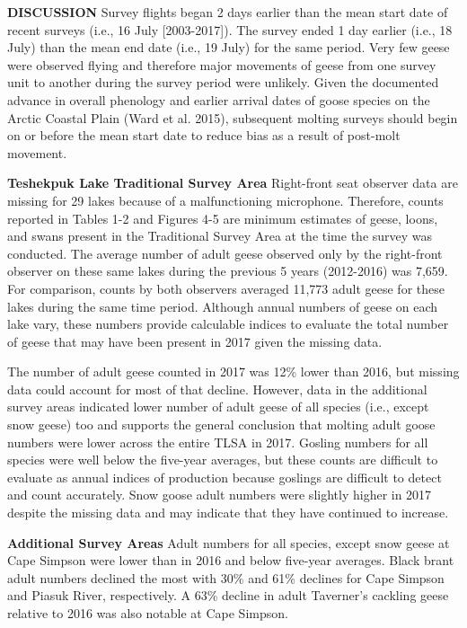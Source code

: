\documentclass[]{article}
\begin{document}
\textbf{DISCUSSION}\break
Survey flights began 2 days earlier than the mean start date of recent
surveys (i.e., 16 July {[}2003-2017{]}). The survey ended 1 day earlier
(i.e., 18 July) than the mean end date (i.e., 19 July) for the same
period. Very few geese were observed flying and therefore major
movements of geese from one survey unit to another during the survey
period were unlikely. Given the documented advance in overall phenology
and earlier arrival dates of goose species on the Arctic Coastal Plain
(Ward et al. 2015), subsequent molting surveys should begin on or before
the mean start date to reduce bias as a result of post-molt movement.

\textbf{Teshekpuk Lake Traditional Survey Area}\newline
Right-front seat observer data are missing for 29 lakes because of a
malfunctioning microphone. Therefore, counts reported in Tables 1-2 and
Figures 4-5 are minimum estimates of geese, loons, and swans present in
the Traditional Survey Area at the time the survey was conducted. The
average number of adult geese observed only by the right-front observer
on these same lakes during the previous 5 years (2012-2016) was 7,659.
For comparison, counts by both observers averaged 11,773 adult geese for
these lakes during the same time period. Although annual numbers of
geese on each lake vary, these numbers provide calculable indices to
evaluate the total number of geese that may have been present in 2017
given the missing data.

The number of adult geese counted in 2017 was 12\% lower than 2016, but
missing data could account for most of that decline. However, data in
the additional survey areas indicated lower number of adult geese of all
species (i.e., except snow geese) too and supports the general
conclusion that molting adult goose numbers were lower across the entire
TLSA in 2017. Gosling numbers for all species were well below the
five-year averages, but these counts are difficult to evaluate as annual
indices of production because goslings are difficult to detect and count
accurately. Snow goose adult numbers were slightly higher in 2017
despite the missing data and may indicate that they have continued to
increase.

\textbf{Additional Survey Areas}\newline
Adult numbers for all species, except snow geese at Cape Simpson were
lower than in 2016 and below five-year averages. Black brant adult
numbers declined the most with 30\% and 61\% declines for Cape Simpson
and Piasuk River, respectively. A 63\% decline in adult Taverner's
cackling geese relative to 2016 was also notable at Cape Simpson.
\end{document}
